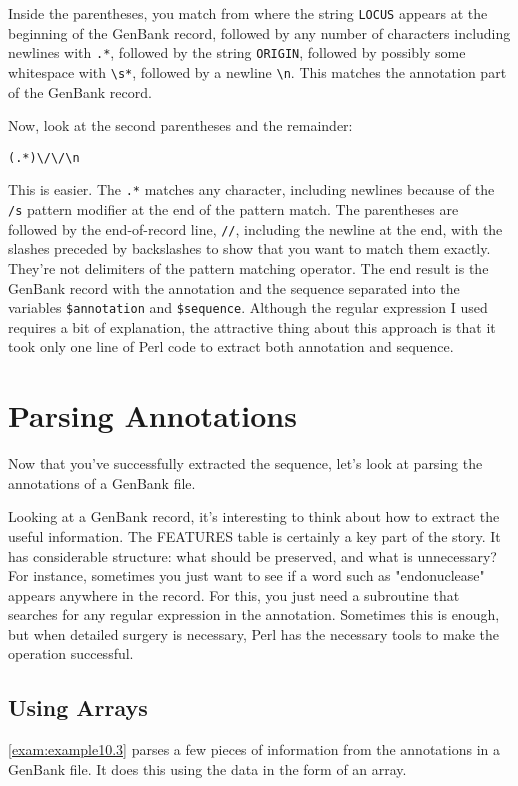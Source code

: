 Inside the parentheses, you match from where the string \verb|LOCUS| appears at the beginning of the GenBank record, followed by any number of characters including newlines with \verb|.*|, followed by the string \verb|ORIGIN|, followed by possibly some whitespace with \verb|\s*|, followed by a newline \verb|\n|. This matches the annotation part of the GenBank record.

Now, look at the second parentheses and the remainder:

\begin{lstlisting}
(.*)\/\/\n
\end{lstlisting}

This is easier. The \verb|.*| matches any character, including newlines because of the \verb|/s| pattern modifier at the end of the pattern match. The parentheses are followed by the end-of-record line, \verb|//|, including the newline at the end, with the slashes preceded by backslashes to show that you want to match them exactly. They're not delimiters of the pattern matching operator. The end result is the GenBank record with the annotation and the sequence separated into the variables \verb|$annotation| and \verb|$sequence|. Although the regular expression I used requires a bit of explanation, the attractive thing about this approach is that it took only one line of Perl code to extract both annotation and sequence. 

\section{Parsing Annotations}
Now that you've successfully extracted the sequence, let's look at parsing the annotations of a GenBank file.

Looking at a GenBank record, it's interesting to think about how to extract the useful information. The FEATURES table is certainly a key part of the story. It has considerable structure: what should be preserved, and what is unnecessary? For instance, sometimes you just want to see if a word such as "endonuclease" appears anywhere in the record. For this, you just need a subroutine that searches for any regular expression in the annotation. Sometimes this is enough, but when detailed surgery is necessary, Perl has the necessary tools to make the operation successful. 

\subsection{Using Arrays}
\autoref{exam:example10.3} parses a few pieces of information from the annotations in a GenBank file. It does this using the data in the form of an array. 
  

